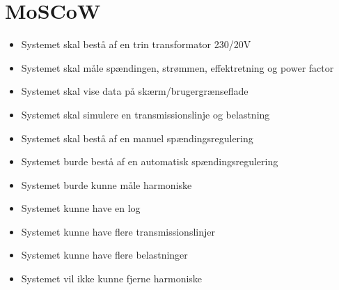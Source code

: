 
\section{MoSCoW}

\begin{itemize}
\item{Systemet skal bestå af en trin transformator 230/20V}
\item{Systemet skal måle spændingen, strømmen, effektretning og power factor}
\item{Systemet skal vise data på skærm/brugergrænseflade}
\item{Systemet skal simulere en transmissionslinje og belastning}
\item{Systemet skal bestå af en manuel spændingsregulering}
\item{Systemet burde bestå af en automatisk spændingsregulering}
\item{Systemet burde kunne måle harmoniske}
\item{Systemet kunne have en log}
\item{Systemet kunne have flere transmissionslinjer}
\item{Systemet kunne have flere belastninger}
\item{Systemet vil ikke kunne fjerne harmoniske} 
\end{itemize}

